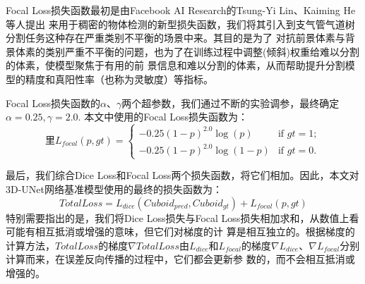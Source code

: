 Focal Loss损失函数最初是由Facebook AI Research的Tsung-Yi Lin、Kaiming He等人\cite{Lin2017FocalLF}提出
来用于稠密的物体检测的新型损失函数，我们将其引入到支气管气道树分割任务这种存在严重类别不平衡的场景中来。其目的是为了
对抗前景体素与背景体素的类别严重不平衡的问题，也为了在训练过程中调整(倾斜)权重给难以分割的体素，使模型聚焦于有用的前
景信息和难以分割的体素，从而帮助提升分割模型的精度和真阳性率（也称为灵敏度）等指标。

Focal Loss损失函数的$\alpha$、$\gamma$两个超参数，我们通过不断的实验调参，最终确定$\alpha = 0.25, \gamma = 2.0$. 本文中使用的Focal Loss损失函数为：
\begin{equation}里\label{eq:focal_loss}
	L_{focal}(p, gt) = \begin{cases}
		- 0.25 (1 - p)^{2.0} \log{(p)} & \text{if } gt = 1; \\
		- 0.25 (1 - p)^{2.0} \log{(1 - p)}  & \text{if } gt = 0.
	\end{cases}
\end{equation}

最后，我们综合Dice Loss和Focal Loss两个损失函数，将它们相加。因此，本文对3D-UNet网络基准模型使用的最终的损失函数为：
\begin{equation}\label{eq:total_loss}
	\mathit{TotalLoss} = L_{dice}\left(Cuboid_{pred}, Cuboid_{gt}\right) + L_{focal}(p, gt)
\end{equation}
特别需要指出的是，我们将Dice Loss损失与Focal Loss损失相加求和，从数值上看可能有相互抵消或增强的意味，但它们对梯度的计
算是相互独立的。根据梯度的计算方法，$\mathit{TotalLoss}$的梯度$\nabla{\mathit{TotalLoss}}$由$L_{dice}$和$L_{focal}$的梯度$\nabla{L_{dice}}$、$\nabla{L_{focal}}$分别计算而来，在误差反向传播的过程中，它们都会更新参
数的，而不会相互抵消或增强的。



